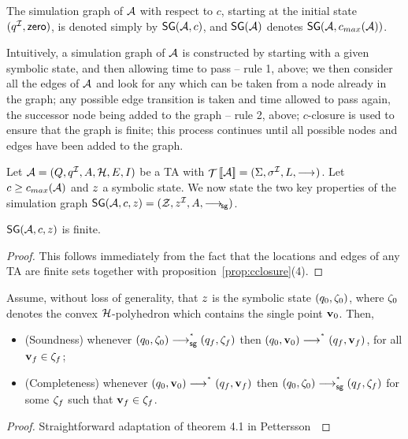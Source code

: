 {\begin{notation}
The simulation graph of $\AA$ with respect to $c$, starting
at the initial state $(\tgiloc,\cczero)$, is denoted simply by $\SG(\AA,c)$,
and $\SG(\AA)$ denotes $\SG(\AA,\cmax(\AA))$.
\end{notation}

Intuitively, a simulation graph of $\AA$ is constructed by starting
with a given symbolic state, and then allowing time to pass -- rule 1,
above; we then consider all the edges of $\AA$ and look for any which
can be taken from a node already in the graph; any possible edge
transition is taken and time allowed to pass again, the successor node
being added to the graph -- rule 2, above; $c$-closure is used to
ensure that the graph is finite; this process continues until all
possible nodes and edges have been added to the graph. 

Let $\AA = (\tglocs,\tgiloc,\Actions,\clocks,\tgedges,\tginv)$ be a TA
with $\TSys{\AA} = (\States,\Init,\Labels,\TRel)$. Let $c \geq
\cmax(\AA)$ and $z$ a symbolic state. We now state the two key
properties of the simulation graph $\SG(\AA,c,\z) =
(\sgstates,\sginit,\Actions,\goesSG{})$.
\begin{proposition}
$\SG(\AA,c,\z)$ is finite.
\end{proposition}
\begin{proof}
This follows immediately from the fact that the locations and edges of
any TA are finite sets together with proposition~\ref{prop:cclosure}(4).
\end{proof}

\begin{proposition}\label{prop:simgraph} 
Assume, without loss of generality, that $z$ is the symbolic state
$(q_0,{\zeta}_0)$, where ${\zeta}_0$ denotes the convex
$\clocks$-polyhedron which contains the single point $\mathbf{v}_0$. Then,
\begin{itemize}
\item (Soundness) whenever $(q_0,{\zeta}_0) \mathrel{\longrightarrow_\mathrm{{\sf sg}}^\mathrm{^*}} 
      (q_f,{\zeta}_f)$ then $(q_0,\mathbf{v}_0) \mathrel{\longrightarrow_\mathrm{{}}^\mathrm{^*}}
      (q_f,\mathbf{v}_f)$, for all $\mathbf{v}_f \in {\zeta}_f$;
\item (Completeness) whenever $(q_0,\mathbf{v}_0) \mathrel{\longrightarrow_\mathrm{{}}^\mathrm{^*}}
      (q_f,\mathbf{v}_f)$ then $(q_0,{\zeta}_0) \mathrel{\longrightarrow_\mathrm{{\sf sg}}^\mathrm{^*}}
      (q_f,{\zeta}_f)$ for some ${\zeta}_f$ such that 
      $\mathbf{v}_f \in {\zeta}_f$. 
\end{itemize}
\end{proposition}
\begin{proof}
Straightforward adaptation of theorem 4.1 in Pettersson~\cite{pet:99}
\end{proof}

}
